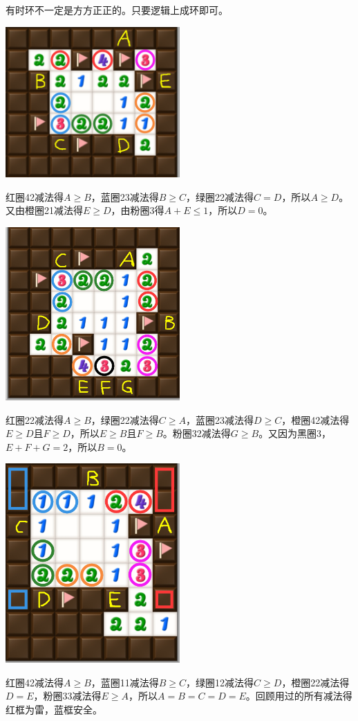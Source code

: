 \vspace{5mm}
有时环不一定是方方正正的。只要逻辑上成环即可。

\vspace{5mm}
\begin{center}
    \includegraphics[width=0.5\textwidth]{trick/环5.png}
\end{center}
红圈42减法得$A\ge B$，蓝圈23减法得$B\ge C$，绿圈22减法得$C=D$，所以$A\ge D$。又由橙圈21减法得$E\ge D$，由粉圈3得$A+E\le 1$，所以$D=0$。

\vspace{5mm}
\begin{center}
    \includegraphics[width=0.5\textwidth]{trick/环6.png}
\end{center}
红圈22减法得$A\ge B$，绿圈22减法得$C\ge A$，蓝圈23减法得$D\ge C$，橙圈42减法得$E\ge D$且$F\ge D$，所以$E\ge B$且$F\ge B$。粉圈32减法得$G\ge B$。又因为黑圈3，$E+F+G=2$，所以$B=0$。

\vspace{5mm}
\begin{center}
    \includegraphics[width=0.5\textwidth]{trick/环7.png}
\end{center}
红圈42减法得$A\ge B$，蓝圈11减法得$B\ge C$，绿圈12减法得$C\ge D$，橙圈22减法得$D=E$，粉圈33减法得$E\ge A$，所以$A=B=C=D=E$。回顾用过的所有减法得红框为雷，蓝框安全。